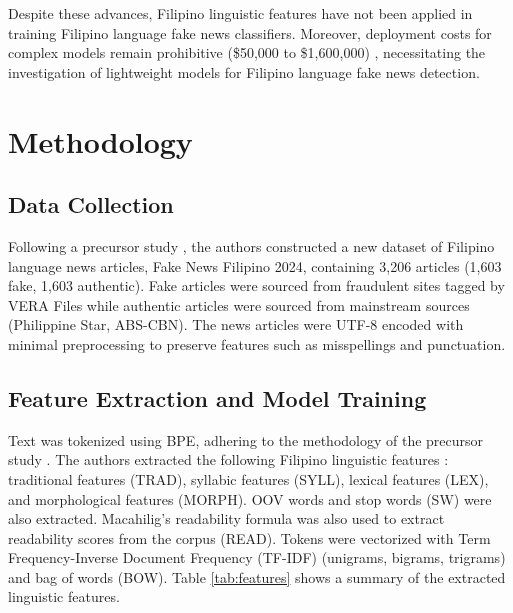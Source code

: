 \documentclass[conference]{IEEEtran}
\begin{document}
Despite these advances, Filipino linguistic features have not been applied in training Filipino language fake news classifiers. Moreover, deployment costs for complex models remain prohibitive (\$50,000 to \$1,600,000) \cite{b4}, necessitating the investigation of lightweight models for Filipino language fake news detection.

\section{Methodology}

\subsection{Data Collection}
Following a precursor study \cite{b3}, the authors constructed a new dataset of Filipino language news articles, Fake News Filipino 2024, containing 3,206 articles (1,603 fake, 1,603 authentic). Fake articles were sourced from fraudulent sites tagged by VERA Files while authentic articles were sourced from mainstream sources (Philippine Star, ABS-CBN). The news articles were UTF-8 encoded with minimal preprocessing to preserve features such as misspellings and punctuation.

\subsection{Feature Extraction and Model Training}
Text was tokenized using BPE, adhering to the methodology of the precursor study \cite{b3}. The authors extracted the following Filipino linguistic features \cite{b8,b9,b10}: traditional features (TRAD), syllabic features (SYLL), lexical features (LEX), and morphological features (MORPH). OOV words and stop words (SW) were also extracted. Macahilig's readability formula \cite{b10} was also used to extract readability scores from the corpus (READ). Tokens were vectorized with Term Frequency-Inverse Document Frequency (TF-IDF) (unigrams, bigrams, trigrams) and bag of words (BOW). Table \ref{tab:features} shows a summary of the extracted linguistic features.
\end{document}
